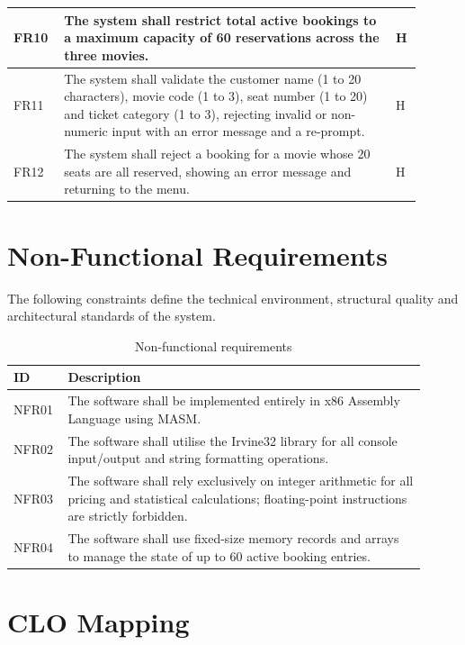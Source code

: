 \documentclass{thesis-library}
\newcommand{\tablefont}{\footnotesize\setstretch{1.15}\hyphenpenalty=10000\relax}
\begin{document}
\begin{table}[H]
\begin{tabular}{|>{\raggedright\arraybackslash}p{0.1\linewidth}|>{\raggedright\arraybackslash}p{0.75\linewidth}|>{\raggedright\arraybackslash}p{0.05\linewidth}|}
\hline
FR10 & The system shall restrict total active bookings to a maximum capacity of 60 reservations across the three movies. & H \\
\hline
FR11 & The system shall validate the customer name (1 to 20 characters), movie code (1 to 3), seat number (1 to 20) and ticket category (1 to 3), rejecting invalid or non-numeric input with an error message and a re-prompt. & H \\
\hline
FR12 & The system shall reject a booking for a movie whose 20 seats are all reserved, showing an error message and returning to the menu. & H \\
\hline
\end{tabular}
\end{table}

\section{Non-Functional Requirements}

The following constraints define the technical environment, structural quality and architectural standards of the system.

\begin{table}[H]
\centering
\caption{Non-functional requirements}
\label{tab:non-func-req}
\tablefont
\begin{tabular}{|>{\raggedright\arraybackslash}p{0.09\linewidth}|>{\raggedright\arraybackslash}p{0.82\linewidth}|}
\hline
\textbf{ID} & \textbf{Description} \\
\hline
NFR01 & The software shall be implemented entirely in x86 Assembly Language using MASM. \\
\hline
NFR02 & The software shall utilise the Irvine32 library for all console input/output and string formatting operations. \\
\hline
NFR03 & The software shall rely exclusively on integer arithmetic for all pricing and statistical calculations; floating-point instructions are strictly forbidden. \\
\hline
NFR04 & The software shall use fixed-size memory records and arrays to manage the state of up to 60 active booking entries. \\
\hline
\end{tabular}
\end{table}

\section{CLO Mapping}
\end{document}

